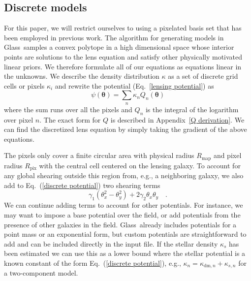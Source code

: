 \documentclass[galley,usenatbib]{mn2e}
\renewcommand{\vec}[1]{\ensuremath{\boldsymbol{#1}}}
\newcommand{\Glass}{{\sc Glass}}
\newcommand{\Rmap}{\ensuremath{R_\mathrm{map}}}
\newcommand{\Rpix}{\ensuremath{R_\mathrm{pix}}}
\newcommand{\eqnref}[1] {Eq.~(\ref{#1})}
\newcommand{\eqnrefp}[1] {(Eq.~\ref{#1})}
\newcommand{\appref}[1] {Appendix~\ref{#1}}
\begin{document}
\subsection{Discrete models}\label{sec:discrete}
For this paper, we will restrict ourselves to using a pixelated basis set that
has been employed in previous work. The algorithm for generating models in
\Glass\ samples a convex polytope in a high dimensional space whose interior
points are solutions to the lens equation and satisfy other physically
motivated linear priors.  We therefore formulate all of our equations as
equations linear in the unknowns. We describe the density distribution $\kappa$
as a set of discrete grid cells or pixels $\kappa_i$ and rewrite the potential
\eqnrefp{lensing potential} as
%
\begin{equation}
  \psi(\vec\theta) = \sum_n \kappa_n Q_n(\vec\theta)
  \label{discrete potential}
\end{equation}
%
where the sum runs over all the pixels and $Q_n$ is the integral of the
logarithm over pixel $n$. The exact form for $Q$ is described in \appref{Q
derivation}.  We can find the discretized lens equation by simply taking the
gradient of the above equations. 

The pixels only cover a finite circular area with physical radius $\Rmap$ and
pixel radius $\Rpix$ with the central cell centered on the lensing galaxy. To
account for any global shearing outside this region from, e.g., a neighboring
galaxy, we also add to \eqnref{discrete potential} two shearing terms
%
\begin{equation}
\label{shear}
\gamma_1(\theta_x^2 - \theta_y^2) + 2\gamma_2\theta_x\theta_y\quad.
\end{equation}
%
We can continue adding terms to account for other potentials. For instance, we
may want to impose a base potential over the field, or add potentials from the
presence of other galaxies in the field. \Glass\ already includes potentials
for a point mass or an exponential form, but custom potentials are
straightforward to add and can be included directly in the input file.  If the
stellar density $\kappa_s$ has been estimated we can use this as a lower bound
where the stellar potential is a known constant of the form \eqnref{discrete
potential}, e.g., $\kappa_n = \kappa_{\mathrm{dm},n} + \kappa_{s,n}$ for a
two-component model.
\end{document}
